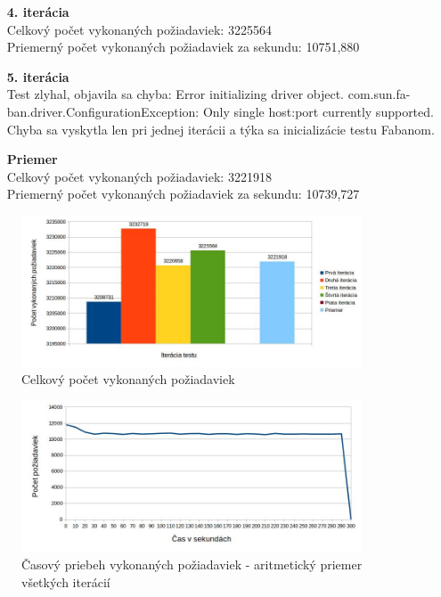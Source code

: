 \documentclass[12pt,oneside,final]{fithesis-utf8}
\begin{document}
\begin{itemize}
\begin{itemize}
\item[\textbf{4. iterácia}]\ \\
Celkový počet vykonaných požiadaviek: 3225564\\
Priemerný počet vykonaných požiadaviek za sekundu: 10751,880

\item[\textbf{5. iterácia}]\ \\
Test zlyhal, objavila sa chyba: Error initializing driver object. com.sun.fa-ban.driver.ConfigurationException: Only single host:port currently supported.\\ Chyba sa vyskytla len pri jednej iterácii a týka sa inicializácie testu Fabanom.\hypertarget{label}{}

\item[\textbf{Priemer}]\ \\
Celkový počet vykonaných požiadaviek: 3221918\\
Priemerný počet vykonaných požiadaviek za sekundu: 10739,727

\end{itemize}

\begin{figure}[H]
  \centering
      \includegraphics[width=0.9\textwidth]{faban2_3.jpg}
  \caption{Celkový počet vykonaných požiadaviek}
\end{figure}

\begin{figure}[H]
  \centering
      \includegraphics[width=0.9\textwidth]{faban2_3_distr.jpg}
  \caption{Časový priebeh vykonaných požiadaviek - aritmetický priemer všetkých iterácií}
\end{figure}


\end{itemize}
\end{document}
